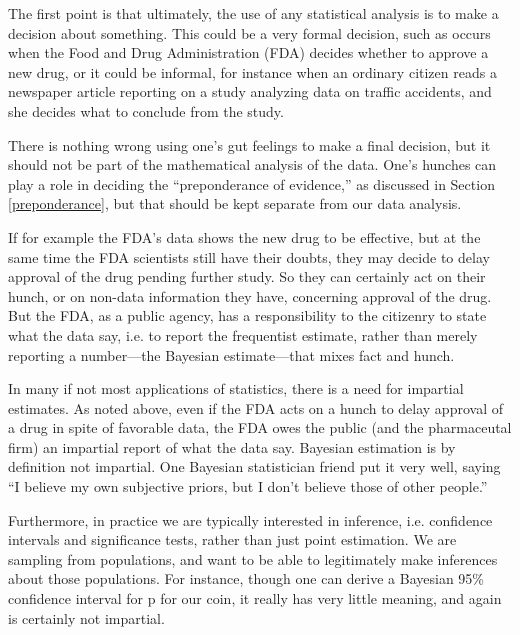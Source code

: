 The first point is that ultimately, the use of any statistical analysis
is to make a decision about something.  This could be a very formal
decision, such as occurs when the Food and Drug Administration (FDA)
decides whether to approve a new drug, or it could be informal, for
instance when an ordinary citizen reads a newspaper article reporting on
a study analyzing data on traffic accidents, and she decides what to
conclude from the study.

There is nothing wrong using one's gut feelings to make a final
decision, but it should not be part of the mathematical analysis of the
data.  One's hunches can play a role in deciding the ``preponderance of
evidence,'' as discussed in Section \ref{preponderance}, but that should
be kept separate from our data analysis.  

If for example the FDA's data shows the new drug to be effective, but at
the same time the FDA scientists still have their doubts, they may
decide to delay approval of the drug pending further study.  So they can
certainly act on their hunch, or on non-data information they have,
concerning approval of the drug.  But the FDA, as a public agency, has a
responsibility to the citizenry to state what the data say, i.e. to
report the frequentist estimate, rather than merely reporting a
number---the Bayesian estimate---that mixes fact and hunch.


In many if not most applications of statistics, there is a need for
impartial estimates.  As noted above, even if the FDA acts on a hunch to
delay approval of a drug in spite of favorable data, the FDA owes the
public (and the pharmaceutal firm) an impartial report of what the data
say.  Bayesian estimation is by definition not impartial.  One Bayesian
statistician friend put it very well, saying ``I believe my own
subjective priors, but I don't believe those of other people.''  

Furthermore, in practice we are typically interested in inference, i.e.
confidence intervals and significance tests, rather than just point
estimation.  We are sampling from populations, and want to be able to
legitimately make inferences about those populations.  For instance,
though one can derive a Bayesian 95\% confidence interval for p for our
coin, it really has very little meaning, and again is certainly not
impartial.

